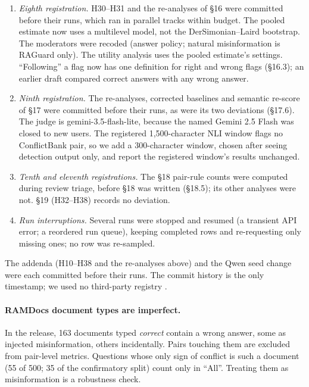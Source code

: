 \begin{enumerate}[leftmargin=*,itemsep=1pt,topsep=2pt]
within the session, the \S15 runs ran in parallel tracks, not strictly in priority order; spend never
approached the \$195 limit, so no run was dropped. The question-level model adds statsmodels 0.14.5.
H21(c) is now a ratio, correct over answered. The registered per-question mean averaged the two conditions
over different questions (those not abstained in every seed), so an earlier draft's selective accuracies did
not match Table~\ref{tab:risk}. Both measures are in the released statistics.
\item \emph{Eighth registration.} H30--H31 and the re-analyses of \S16 were committed before their runs, which
ran in parallel tracks within budget. The pooled estimate now uses a multilevel model, not the
DerSimonian--Laird bootstrap. The moderators were recoded (answer policy; natural misinformation is RAGuard only).
The utility analysis uses the pooled estimate's settings. ``Following'' a flag now has one definition for
right and wrong flags (\S16.3); an earlier draft compared correct answers with any wrong answer.
\item \emph{Ninth registration.} The re-analyses, corrected baselines and semantic re-score of \S17 were committed
before their runs, as were its two deviations (\S17.6). The judge is
gemini-3.5-flash-lite, because the named Gemini 2.5 Flash was closed to new users. The registered
1,500-character NLI window flags no ConflictBank pair, so we add a 300-character window, chosen after seeing
detection output only, and report the registered window's results unchanged.
\item \emph{Tenth and eleventh registrations.} The \S18 pair-rule counts were computed during review triage, before
\S18 was written (\S18.5); its other analyses were not. \S19 (H32--H38) records no deviation.
\item \emph{Run interruptions.} Several runs were stopped and resumed (a transient API error; a reordered run
queue), keeping completed rows and re-requesting only missing ones; no row was re-sampled.
\end{enumerate}
The addenda (H10--H38 and the re-analyses above) and the Qwen seed change were each committed before
their runs. The commit history is the only timestamp; we used no third-party registry
\citep{vanmiltenburg2021preregistering}.

\paragraph{RAMDocs document types are imperfect.} In the release, 163 documents typed \emph{correct} contain a
wrong answer, some as injected misinformation, others incidentally. Pairs touching them are excluded from pair-level
metrics. Questions whose only sign of conflict is such a document (55 of 500; 35 of the confirmatory split) count
only in ``All''. Treating them as misinformation is a robustness check.

